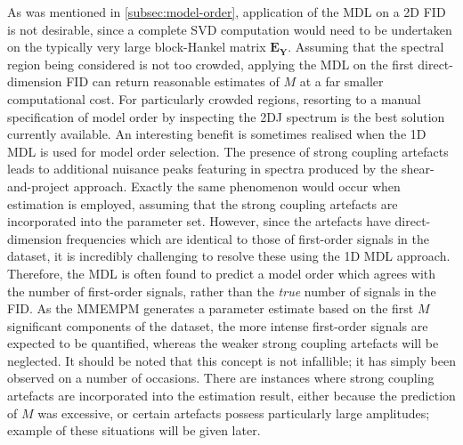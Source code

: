 As was mentioned in \cref{subsec:model-order}, application of the
\ac{MDL} on a \ac{2D} \ac{FID} is not desirable, since a complete \ac{SVD}
computation would need to be undertaken on the typically very large
block-Hankel matrix $\symbf{E}_{\symbf{Y}}$.
Assuming that the spectral region being considered is not too
crowded, applying the \ac{MDL} on the first direct-dimension \ac{FID} can
return reasonable estimates of $M$ at a far smaller computational cost. For
particularly crowded regions, resorting to a manual specification of model
order by inspecting the \ac{2DJ} spectrum is the best solution currently
available.
An interesting benefit is sometimes realised when the \ac{1D} \ac{MDL} is
used for model order selection.
The presence of strong coupling artefacts leads to
additional nuisance peaks featuring in spectra produced by the
shear-and-project approach. Exactly the
same phenomenon would occur when estimation is employed, assuming
that the strong coupling artefacts are incorporated into the parameter
set. However, since the
artefacts have direct-dimension frequencies which are identical to those of
first-order signals in the dataset, it is incredibly challenging to resolve
these using the \ac{1D} \ac{MDL} approach. Therefore, the \ac{MDL} is often
found to predict a model order which agrees with the number of first-order
signals, rather than the \emph{true} number of signals in the \ac{FID}. As the
\ac{MMEMPM} generates a parameter estimate based on the first $M$ significant
components of the dataset, the more intense first-order signals are expected to
be quantified, whereas the weaker strong coupling artefacts will be neglected.
It should be noted that this concept is not infallible; it has simply been
observed on a number of occasions. There are instances where strong coupling
artefacts are incorporated into the estimation result, either because the
prediction of $M$ was excessive, or certain artefacts possess particularly
large amplitudes; example of these situations will be given later.

